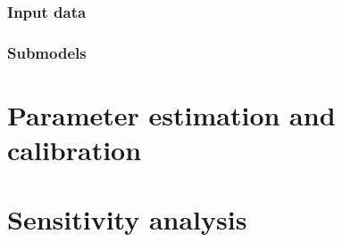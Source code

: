 \subsubsection{Input data}
\label{thiele:intro:example:input}

\subsubsection{Submodels}
\label{thiele:intro:example:submodels}

\section{Parameter estimation and calibration}
\label{thiele:parameter_estimation}

\section{Sensitivity analysis}
\label{thiele:sensitivity_analysis}

